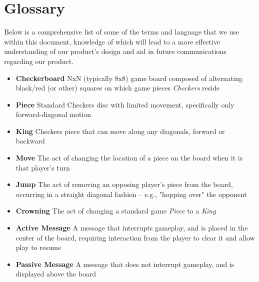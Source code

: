 \documentclass[letterpaper]{article}
\begin{document}
\newpage

\section{Glossary}
\label{sec:glossary}

Below is a comprehensive list of some of the terms and language
that we use within this document, knowledge of which will lead
to a more effective understanding of our product's design and
aid in future communications regarding our product.

\begin{itemize}
    \item \textbf{Checkerboard} NxN (typically 8x8) game board
          composed of alternating black/red (or other) squares
          on which game pieces \emph{Checkers} reside
    \item \textbf{Piece} Standard Checkers disc with limited
          movement, specifically only forward-diagonal motion
    \item \textbf{King} Checkers piece that can move along any
          diagonals, forward or backward
    \item \textbf{Move} The act of changing the location of a
          piece on the board when it is that player's turn
    \item \textbf{Jump} The act of removing an opposing player's
          piece from the board, occurring in a straight diagonal
          fashion -- e.g., "hopping over" the opponent
    \item \textbf{Crowning} The act of changing a standard
          game \emph{Piece} to a \emph{King}
    \item \textbf{Active Message} A message that interrupts gameplay,
    	  and is placed in the center of the board, requiring 
          interaction from the player to clear it and allow play
          to resume
    \item \textbf{Passive Message} A message that does not interrupt
    	  gameplay, and is displayed above the board
\end{itemize}

\end{document}
